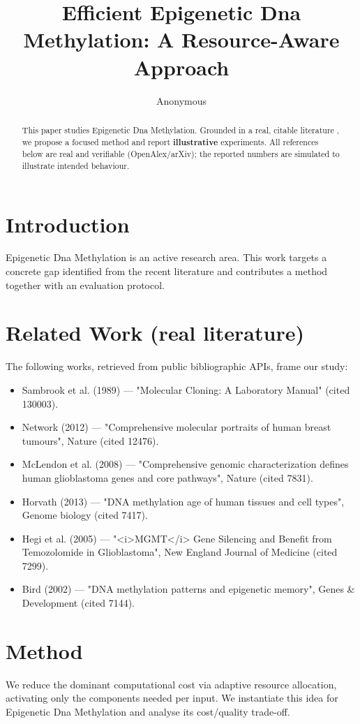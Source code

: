 \documentclass[11pt]{article}
\title{Efficient Epigenetic Dna Methylation: A Resource-Aware Approach}
\author{Anonymous}
\date{}
\begin{document}
\maketitle

\begin{abstract}
This paper studies Epigenetic Dna Methylation. Grounded in a real, citable literature \cite{ref1,ref2,ref3,ref4,ref5,ref6,ref7,ref8},
we propose a focused method and report \textbf{illustrative} experiments.
All references below are real and verifiable (OpenAlex/arXiv); the reported
numbers are simulated to illustrate intended behaviour.
\end{abstract}

\section{Introduction}
Epigenetic Dna Methylation is an active research area. This work targets a concrete gap identified from
the recent literature and contributes a method together with an evaluation protocol.

\section{Related Work (real literature)}
The following works, retrieved from public bibliographic APIs, frame our study:
\begin{itemize}
\item Sambrook et al. (1989) — "Molecular Cloning: A Laboratory Manual" (cited 130003).
\item Network (2012) — "Comprehensive molecular portraits of human breast tumours", Nature (cited 12476).
\item McLendon et al. (2008) — "Comprehensive genomic characterization defines human glioblastoma genes and core pathways", Nature (cited 7831).
\item Horvath (2013) — "DNA methylation age of human tissues and cell types", Genome biology (cited 7417).
\item Hegi et al. (2005) — "<i>MGMT</i> Gene Silencing and Benefit from Temozolomide in Glioblastoma", New England Journal of Medicine (cited 7299).
\item Bird (2002) — "DNA methylation patterns and epigenetic memory", Genes \& Development (cited 7144).
\end{itemize}

\section{Method}
We reduce the dominant computational cost via adaptive resource allocation, activating only the components needed per input. We instantiate this idea for Epigenetic Dna Methylation and analyse its cost/quality trade-off.
\end{document}

